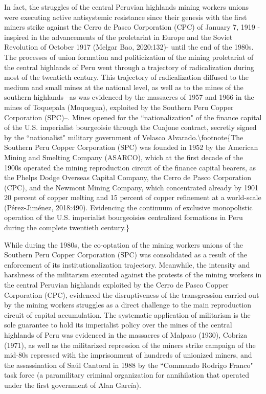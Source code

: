 \documentclass[
]{article}
\begin{document}
In fact, the struggles of the central Peruvian highlands mining workers
unions were executing active antisystemic resistance since their genesis
with the first miners strike against the Cerro de Pasco Corporation
(CPC) of January 7, 1919 -inspired in the advancements of the
proletariat in Europe and the Soviet Revolution of October 1917 (Melgar
Bao, 2020:132)- until the end of the 1980s. The processes of union
formation and politicization of the mining proletariat of the central
highlands of Peru went through a trajectory of radicalization during
most of the twentieth century. This trajectory of radicalization
diffused to the medium and small mines at the national level, as well as
to the mines of the southern highlands --as was evidenced by the
massacres of 1957 and 1966 in the mines of Toquepala (Moquegua),
exploited by the Southern Peru Copper Corporation (SPC)--. Mines opened
for the ``nationalization" of the finance capital of the U.S.
imperialist bourgeoisie through the Cuajone contract, secretly signed by
the ``nationalist" military government of Velasco
Alvarado.\textbackslash footnote\{The Southern Peru Copper Corporation
(SPC) was founded in 1952 by the American Mining and Smelting Company
(ASARCO), which at the first decade of the 1900s operated the mining
reproduction circuit of the finance capital bearers, as the Phelps Dodge
Overseas Capital Company, the Cerro de Pasco Corporation (CPC), and the
Newmont Mining Company, which concentrated already by 1901 20 percent of
copper melting and 15 percent of copper refinement at a world-scale
(Pérez-Jiménez, 2018:490). Evidencing the continuum of exclusive
monopolistic operation of the U.S. imperialist bourgeoisies centralized
formations in Peru during the complete twentieth century.\}

While during the 1980s, the co-optation of the mining workers unions of
the Southern Peru Copper Corporation (SPC) was consolidated as a result
of the enforcement of its institutionalization trajectory. Meanwhile,
the intensity and harshness of the militarism executed against the
protests of the mining workers in the central Peruvian highlands
exploited by the Cerro de Pasco Copper Corporation (CPC), evidenced the
disruptiveness of the transgression carried out by the mining workers
struggles as a direct challenge to the main reproduction circuit of
capital accumulation. The systematic application of militarism is the
sole guarantee to hold its imperialist policy over the mines of the
central highlands of Peru was evidenced in the massacres of Malpaso
(1930), Cobriza (1971), as well as the militarized repression of the
miners\textquotesingle{} strike campaign of the mid-80s repressed with
the imprisonment of hundreds of unionized miners, and the assassination
of Saúl Cantoral in 1988 by the ``Commando Rodrigo Franco" task force (a
paramilitary criminal organization for annihilation that operated under
the first government of Alan García).
\end{document}
